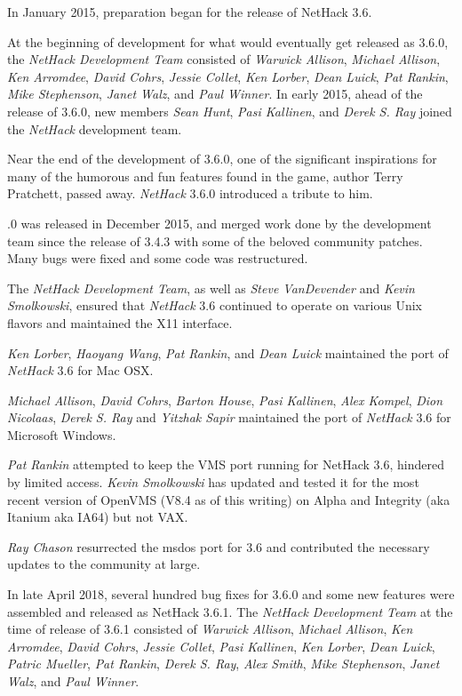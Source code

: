 \medskip
In January 2015, preparation began for the release of NetHack 3.6.

\medskip
At the beginning of development for what would eventually get released
as 3.6.0, the {\it NetHack Development Team} consisted of {\it Warwick Allison},
{\it Michael Allison}, {\it Ken Arromdee},
{\it David Cohrs}, {\it Jessie Collet},
{\it Ken Lorber}, {\it Dean Luick}, {\it Pat Rankin},
{\it Mike Stephenson}, {\it Janet Walz}, and {\it Paul Winner}.
In early 2015, ahead of the release of 3.6.0, new members
{\it Sean Hunt}, {\it Pasi Kallinen}, and {\it Derek S. Ray}
joined the {\it NetHack\/} development team.

\medskip
Near the end of the development of 3.6.0, one of the significant inspirations
for many of the humorous and fun features found in the game,
author Terry Pratchett, passed away. {\it NetHack\/} 3.6.0 introduced
a tribute to him.

.0 was released in December 2015, and merged work done by the development
team since the release of 3.4.3 with some of the beloved community
patches.  Many bugs were fixed and some code was restructured.

\medskip
The {\it NetHack Development Team}, as well as {\it Steve VanDevender} and
{\it Kevin Smolkowski}, ensured that {\it NetHack\/} 3.6 continued to
operate on various Unix flavors and maintained the X11 interface.

\medskip
{\it Ken Lorber}, {\it Haoyang Wang}, {\it Pat Rankin}, and {\it Dean Luick}
maintained the port of {\it NetHack\/} 3.6 for Mac OSX.

\medskip
{\it Michael Allison}, {\it David Cohrs}, {\it Barton House},
{\it Pasi Kallinen}, {\it Alex Kompel}, {\it Dion Nicolaas},
{\it Derek S. Ray} and  {\it Yitzhak Sapir}
maintained the port of  {\it NetHack\/} 3.6 for Microsoft Windows.

\medskip
{\it Pat Rankin} attempted to keep the VMS port running for NetHack 3.6,
hindered by limited access.  {\it Kevin Smolkowski} has updated and tested it
for the most recent version of OpenVMS (V8.4 as of this writing) on Alpha
and Integrity (aka Itanium aka IA64) but not VAX.

\medskip
{\it Ray Chason}  resurrected the msdos port for 3.6 and contributed the
necessary updates to the community at large.

\medskip
In late April 2018, several hundred bug fixes for 3.6.0 and some new features
were assembled and released as NetHack 3.6.1. The {\it NetHack Development Team} at the
time of release of 3.6.1 consisted of
{\it Warwick Allison}, {\it Michael Allison}, {\it Ken Arromdee},
{\it David Cohrs}, {\it Jessie Collet},
{\it Pasi Kallinen}, {\it Ken Lorber}, {\it Dean Luick},
{\it Patric Mueller}, {\it Pat Rankin}, {\it Derek S. Ray},
{\it Alex Smith}, {\it Mike Stephenson}, {\it Janet Walz}, and
{\it Paul Winner}.


